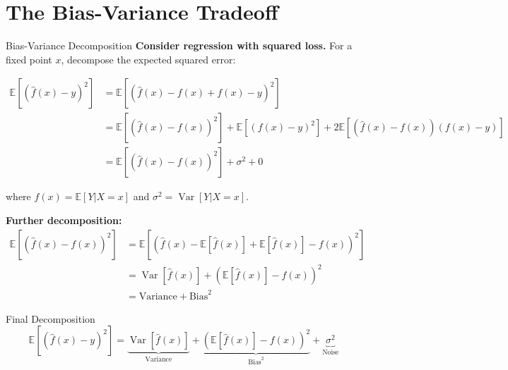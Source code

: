 \documentclass[aspectratio=169,11pt]{beamer}
\newcommand{\E}{\mathbb{E}}
\newcommand{\Var}{\operatorname{Var}}
\begin{document}
\section{The Bias-Variance Tradeoff}

\begin{frame}{Bias-Variance Decomposition}
\textbf{Consider regression with squared loss.} For a fixed point $x$, decompose the expected squared error:

\begin{align}
\E[(\hat{f}(x) - y)^2] &= \E[(\hat{f}(x) - f(x) + f(x) - y)^2]\\
&= \E[(\hat{f}(x) - f(x))^2] + \E[(f(x) - y)^2] + 2\E[(\hat{f}(x) - f(x))(f(x) - y)]\\
&= \E[(\hat{f}(x) - f(x))^2] + \sigma^2 + 0
\end{align}

where $f(x) = \E[Y|X = x]$ and $\sigma^2 = \Var[Y|X = x]$.

\textbf{Further decomposition:}
\begin{align}
\E[(\hat{f}(x) - f(x))^2] &= \E[(\hat{f}(x) - \E[\hat{f}(x)] + \E[\hat{f}(x)] - f(x))^2]\\
&= \Var[\hat{f}(x)] + (\E[\hat{f}(x)] - f(x))^2\\
&= \text{Variance} + \text{Bias}^2
\end{align}

\begin{block}{Final Decomposition}
\[\boxed{\E[(\hat{f}(x) - y)^2] = \underbrace{\Var[\hat{f}(x)]}_{\text{Variance}} + \underbrace{(\E[\hat{f}(x)] - f(x))^2}_{\text{Bias}^2} + \underbrace{\sigma^2}_{\text{Noise}}}\]
\end{block}
\end{frame}
\end{document}
